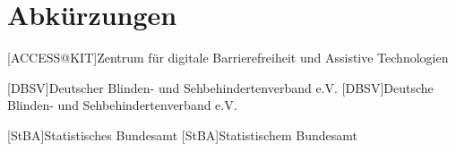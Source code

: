 \chapter{Abkürzungen}

\begin{acronym}[XXXXXX]

    [ACCESS@KIT]{Zentrum für digitale Barrierefreiheit und Assistive Technologien}

    [DBSV]{Deutscher Blinden- und Sehbehindertenverband e.V.}
    [DBSV]{Deutsche Blinden- und Sehbehindertenverband e.V.}
    

    [StBA]{Statistisches Bundesamt}
    [StBA]{Statistischem Bundesamt}
    

\end{acronym}
